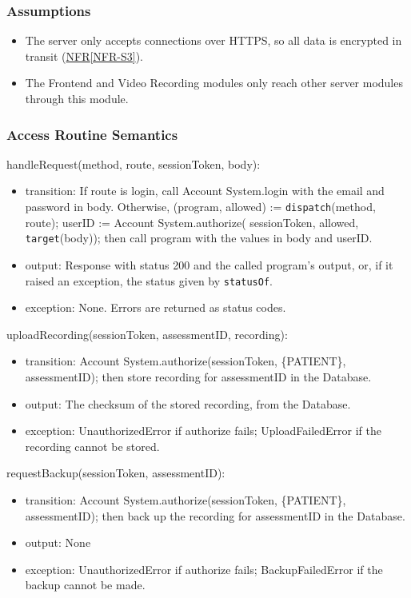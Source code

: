 \documentclass[12pt, titlepage]{article}
\newcommand{\srsref}[2]{\href{https://github.com/Nour-Fawaz/MacaBoca/blob/main/pdfs/SRS/SRS.pdf}{#1\ref*{#2}}}
\begin{document}
\subsubsection{Assumptions}
\begin{itemize}
\item The server only accepts connections over HTTPS, so all data is encrypted
  in transit (\srsref{NFR}{NFR-S3}).
\item The Frontend and Video Recording modules only reach other server modules
  through this module.
\end{itemize}

\subsubsection{Access Routine Semantics}

\noindent handleRequest(method, route, sessionToken, body):
\begin{itemize}
\item transition: If route is login, call Account System.login with the email
  and password in body. Otherwise, (program, allowed) :=
  \texttt{dispatch}(method, route); userID := Account System.authorize(
  sessionToken, allowed, \texttt{target}(body)); then call program with the
  values in body and userID.
\item output: Response with status 200 and the called program's output, or,
  if it raised an exception, the status given by \texttt{statusOf}.
\item exception: None. Errors are returned as status codes.
\end{itemize}

\noindent uploadRecording(sessionToken, assessmentID, recording):
\begin{itemize}
\item transition: Account System.authorize(sessionToken, \{PATIENT\},
  assessmentID); then store recording for assessmentID in the Database.
\item output: The checksum of the stored recording, from the Database.
\item exception: UnauthorizedError if authorize fails; UploadFailedError if
  the recording cannot be stored.
\end{itemize}

\noindent requestBackup(sessionToken, assessmentID):
\begin{itemize}
\item transition: Account System.authorize(sessionToken, \{PATIENT\},
  assessmentID); then back up the recording for assessmentID in the Database.
\item output: None
\item exception: UnauthorizedError if authorize fails; BackupFailedError if
  the backup cannot be made.
\end{itemize}
\end{document}
